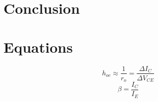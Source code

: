 \section{Conclusion}
\label{sec:conclusion}

\section{Equations}
\label{sec:equations}

%
\begin{equation}
  \label{eq:hoe}
  h_{oe} \approx \frac{1}{r_o} = \frac{\Delta I_C}{\Delta V_{CE}}
\end{equation}
\begin{equation}
  \label{eq:beta}
  \beta = \frac{I_C}{I_E}
\end{equation}


